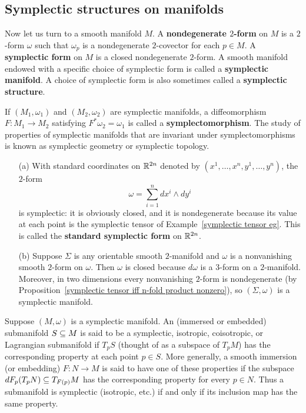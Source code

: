 \subsection{Symplectic structures on manifolds}
Now let us turn to a smooth manifold $M$. A \textbf{nondegenerate $2$-form} on $M$ is a $2$-form $\omega$ such that $\omega_p$ is a nondegenerate $2$-covector for each $p\in M$. A \textbf{symplectic form} on $M$ is a closed nondegenerate $2$-form. A smooth manifold endowed with a specific choice of symplectic form is called a \textbf{symplectic manifold}. A choice of symplectic form is also sometimes called a \textbf{symplectic structure}.\par
If $(M_1,\omega_1)$ and $(M_2,\omega_2)$ are symplectic manifolds, a diffeomorphism $F:M_1\to M_2$ satisfying $F^*\omega_2=\omega_1$ is called a \textbf{symplectomorphism}. The study of properties of symplectic manifolds that are invariant under symplectomorphisms is known as symplectic geometry or symplectic topology.
\begin{example}
\mbox{}
\begin{itemize}
\item[(a)] With standard coordinates on $\mathbb{R}^{2n}$ denoted by $(x^1,\dots,x^n,y^1,\dots,y^n)$, the $2$-form
\[\omega=\sum_{i=1}^{n}dx^i\wedge dy^i\]
is symplectic: it is obviously closed, and it is nondegenerate because its value at each point is the symplectic tensor of Example~\ref{symplectic tensor eg}. This is called the \textbf{standard symplectic form} on $\mathbb{R}^{2n}$.
\item[(b)] Suppose $\Sigma$ is any orientable smooth $2$-manifold and $\omega$ is a nonvanishing smooth $2$-form on $\omega$. Then $\omega$ is closed because $d\omega$ is a $3$-form on a $2$-manifold.
Moreover, in two dimensions every nonvanishing $2$-form is nondegenerate (by Proposition~\ref{symplectic tensor iff n-fold product nonzero}), so $(\Sigma,\omega)$ is a symplectic manifold.
\end{itemize}
\end{example}
Suppose $(M,\omega)$ is a symplectic manifold. An (immersed or embedded) submanifold $S\subseteq M$ is said to be a symplectic, isotropic, coisotropic, or Lagrangian submanifold if $T_pS$ (thought of as a subspace of $T_pM$) has the corresponding property at each point $p\in S$. More generally, a smooth immersion (or embedding) $F:N\to M$ is said to have one of these properties if the subspace $dF_p(T_pN)\subseteq T_{F(p)}M$ has the corresponding property for every $p\in N$. Thus a submanifold is symplectic (isotropic, etc.) if and only if its inclusion map has the same property.
